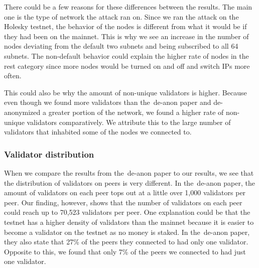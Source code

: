 There could be a few reasons for these differences between the results.
The main one is the type of network the attack ran on.
Since we ran the attack on the Holesky testnet, the behavior of the nodes is different from what it would be if they had been on the mainnet.
This is why we see an increase in the number of nodes deviating from the default two subnets and being subscribed to all 64 subnets.
The non-default behavior could explain the higher rate of nodes in the rest category since more nodes would be turned on and off and switch IPs more often.


This could also be why the amount of non-unique validators is higher.
Because even though we found more validators than the~\gls{de-anon paper} and de-anonymized a greater portion of the network, we found a higher rate of non-unique validators comparatively.
We attribute this to the large number of validators that inhabited some of the nodes we connected to.



\subsubsection{Validator distribution}\label{subsubsec:validator-distribution}
When we compare the results from the~\gls{de-anon paper} to our results, we see that the distribution of validators on peers is very different.
In the~\gls{de-anon paper}, the amount of validators on each peer tops out at a little over 1,000 validators per peer.
Our finding, however, shows that the number of validators on each peer could reach up to 70,523 validators per peer.
One explanation could be that the testnet has a higher density of validators than the mainnet because it is easier to become a validator on the testnet as no money is staked.
In the~\gls{de-anon paper}, they also state that 27\% of the peers they connected to had only one validator.
Opposite to this, we found that only 7\% of the peers we connected to had just one validator.
